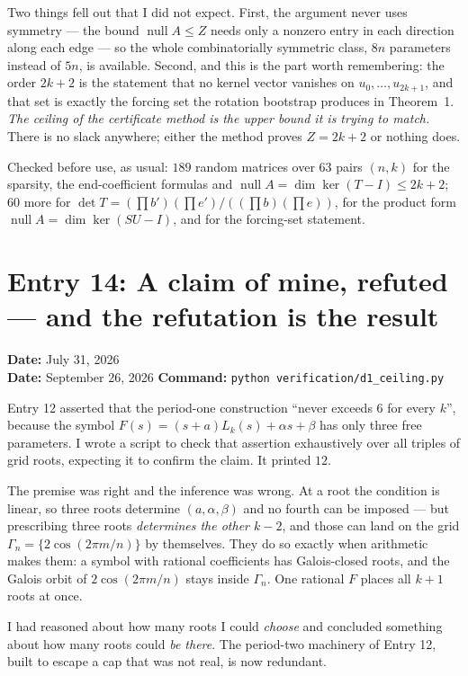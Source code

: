 \documentclass[12pt]{article}
\begin{document}
Two things fell out that I did not expect. First, the argument never uses
symmetry --- the bound $\operatorname{null}A\le Z$ needs only a nonzero entry in
each direction along each edge --- so the whole combinatorially symmetric class,
$8n$ parameters instead of $5n$, is available. Second, and this is the part
worth remembering: the order $2k+2$ is the statement that no kernel vector
vanishes on $u_0,\dots,u_{2k+1}$, and that set is exactly the forcing set the
rotation bootstrap produces in Theorem~1. \emph{The ceiling of the certificate
method is the upper bound it is trying to match.} There is no slack anywhere;
either the method proves $Z=2k+2$ or nothing does.

Checked before use, as usual: $189$ random matrices over $63$ pairs $(n,k)$ for
the sparsity, the end-coefficient formulas and
$\operatorname{null}A=\dim\ker(T-I)\le2k+2$; $60$ more for
$\det T=(\prod b')(\prod e')/((\prod b)(\prod e))$, for the product form
$\operatorname{null}A=\dim\ker(SU-I)$, and for the forcing-set statement.


\clearpage
\section*{Entry 14: A claim of mine, refuted --- and the refutation is the result}
\textbf{Date:} July 31, 2026\\
\textbf{Date:} September 26, 2026 \quad
\textbf{Command:} \texttt{python verification/d1\_ceiling.py}

Entry 12 asserted that the period-one construction ``never exceeds $6$ for
every $k$'', because the symbol
$F(s)=(s+a)L_k(s)+\alpha s+\beta$ has only three free parameters. I wrote a
script to check that assertion exhaustively over all triples of grid roots,
expecting it to confirm the claim. It printed $12$.

The premise was right and the inference was wrong. At a root the condition is
linear, so three roots determine $(a,\alpha,\beta)$ and no fourth can be
imposed --- but prescribing three roots \emph{determines the other $k-2$}, and
those can land on the grid $\Gamma_n=\{2\cos(2\pi m/n)\}$ by themselves. They
do so exactly when arithmetic makes them: a symbol with rational coefficients
has Galois-closed roots, and the Galois orbit of $2\cos(2\pi m/n)$ stays inside
$\Gamma_n$. One rational $F$ places all $k+1$ roots at once.

I had reasoned about how many roots I could \emph{choose} and concluded
something about how many roots could \emph{be there}. The period-two machinery
of Entry 12, built to escape a cap that was not real, is now redundant.
\end{document}
